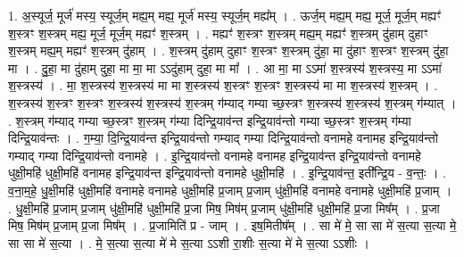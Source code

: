 \documentclass[17pt]{extarticle}
\begin{document}
1. अ॒स्यूर्ज॒ मूर्ज॑ मस्य॒ स्यूर्ज॒म् मह्य॒म् मह्य॒ मूर्ज॑ मस्य॒ स्यूर्ज॒म् मह्य᳚म् । . ऊर्ज॒म् मह्य॒म् मह्य॒ मूर्ज॒ मूर्ज॒म् मह्यꣳ॑ श॒स्त्रꣳ श॒स्त्रम् मह्य॒ मूर्ज॒ मूर्ज॒म् मह्यꣳ॑ श॒स्त्रम् । . मह्यꣳ॑ श॒स्त्रꣳ श॒स्त्रम् मह्य॒म् मह्यꣳ॑ श॒स्त्रम् दु॑हाम् दुहाꣳ श॒स्त्रम् मह्य॒म् मह्यꣳ॑ श॒स्त्रम् दु॑हाम् । . श॒स्त्रम् दु॑हाम् दुहाꣳ श॒स्त्रꣳ श॒स्त्रम् दु॑हा॒ मा दु॑हाꣳ श॒स्त्रꣳ श॒स्त्रम् दु॑हा॒ मा । . दु॒हा॒ मा दु॑हाम् दुहा॒ मा मा॒ मा ऽऽदु॑हाम् दुहा॒ मा मा᳚ । . आ मा॒ मा ऽऽमा॑ श॒स्त्रस्य॑ श॒स्त्रस्य॒ मा ऽऽमा॑ श॒स्त्रस्य॑ । . मा॒ श॒स्त्रस्य॑ श॒स्त्रस्य॑ मा मा श॒स्त्रस्य॑ श॒स्त्रꣳ श॒स्त्रꣳ श॒स्त्रस्य॑ मा मा श॒स्त्रस्य॑ श॒स्त्रम् । . श॒स्त्रस्य॑ श॒स्त्रꣳ श॒स्त्रꣳ श॒स्त्रस्य॑ श॒स्त्रस्य॑ श॒स्त्रम् ग॑म्याद् गम्या च्छ॒स्त्रꣳ श॒स्त्रस्य॑ श॒स्त्रस्य॑ श॒स्त्रम् ग॑म्यात् । . श॒स्त्रम् ग॑म्याद् गम्या च्छ॒स्त्रꣳ श॒स्त्रम् ग॑म्या दिन्द्रि॒याव॑न्त इन्द्रि॒याव॑न्तो गम्या च्छ॒स्त्रꣳ श॒स्त्रम् ग॑म्या दिन्द्रि॒याव॑न्तः । . ग॒म्या॒ दि॒न्द्रि॒याव॑न्त इन्द्रि॒याव॑न्तो गम्याद् गम्या दिन्द्रि॒याव॑न्तो वनामहे वनामह इन्द्रि॒याव॑न्तो गम्याद् गम्या दिन्द्रि॒याव॑न्तो वनामहे । . इ॒न्द्रि॒याव॑न्तो वनामहे वनामह इन्द्रि॒याव॑न्त इन्द्रि॒याव॑न्तो वनामहे धुक्षी॒महि॑ धुक्षी॒महि॑ वनामह इन्द्रि॒याव॑न्त इन्द्रि॒याव॑न्तो वनामहे धुक्षी॒महि॑ । . इ॒न्द्रि॒याव॑न्त॒ इती᳚न्द्रि॒य - व॒न्तः॒ । . व॒ना॒म॒हे॒ धु॒क्षी॒महि॑ धुक्षी॒महि॑ वनामहे वनामहे धुक्षी॒महि॑ प्र॒जाम् प्र॒जाम् धु॑क्षी॒महि॑ वनामहे वनामहे धुक्षी॒महि॑ प्र॒जाम् । . धु॒क्षी॒महि॑ प्र॒जाम् प्र॒जाम् धु॑क्षी॒महि॑ धुक्षी॒महि॑ प्र॒जा मिष॒ मिष॑म् प्र॒जाम् धु॑क्षी॒महि॑ धुक्षी॒महि॑ प्र॒जा मिष᳚म् । . प्र॒जा मिष॒ मिष॑म् प्र॒जाम् प्र॒जा मिष᳚म् । . प्र॒जामिति॑ प्र - जाम् । . इष॒मितीष᳚म् । . सा मे॑ मे॒ सा सा मे॑ स॒त्या स॒त्या मे॒ सा सा मे॑ स॒त्या । . मे॒ स॒त्या स॒त्या मे॑ मे स॒त्या ऽऽशी रा॒शीः स॒त्या मे॑ मे स॒त्या ऽऽशीः । \newline
\end{document}
